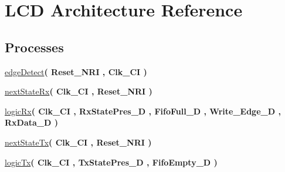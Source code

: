 \hypertarget{classLcdDriver_1_1LCD}{}\section{L\+CD Architecture Reference}
\label{classLcdDriver_1_1LCD}
\subsection*{Processes}
 \begin{DoxyCompactItemize}
\item 
\mbox{\label{classLcdDriver_1_1LCD_a8ddfdcf7d5753d2b8a763c46b1f66ede}} 
\hyperlink{classLcdDriver_1_1LCD_a8ddfdcf7d5753d2b8a763c46b1f66ede}{edge\+Detect}{\bfseries  ( {\bfseries \textcolor{vhdlchar}{Reset\+\_\+\+N\+RI}\textcolor{vhdlchar}{ }} , {\bfseries \textcolor{vhdlchar}{Clk\+\_\+\+CI}\textcolor{vhdlchar}{ }} )}
\item 
\mbox{\label{classLcdDriver_1_1LCD_a220a6885d47f04cad3e5b2a6f1528fd7}} 
\hyperlink{classLcdDriver_1_1LCD_a220a6885d47f04cad3e5b2a6f1528fd7}{next\+State\+Rx}{\bfseries  ( {\bfseries \textcolor{vhdlchar}{Clk\+\_\+\+CI}\textcolor{vhdlchar}{ }} , {\bfseries \textcolor{vhdlchar}{Reset\+\_\+\+N\+RI}\textcolor{vhdlchar}{ }} )}
\item 
\mbox{\label{classLcdDriver_1_1LCD_af3c0d0502a4e6217e00a6144a519144b}} 
\hyperlink{classLcdDriver_1_1LCD_af3c0d0502a4e6217e00a6144a519144b}{logic\+Rx}{\bfseries  ( {\bfseries \textcolor{vhdlchar}{Clk\+\_\+\+CI}\textcolor{vhdlchar}{ }} , {\bfseries \textcolor{vhdlchar}{Rx\+State\+Pres\+\_\+D}\textcolor{vhdlchar}{ }} , {\bfseries \textcolor{vhdlchar}{Fifo\+Full\+\_\+D}\textcolor{vhdlchar}{ }} , {\bfseries \textcolor{vhdlchar}{Write\+\_\+\+Edge\+\_\+D}\textcolor{vhdlchar}{ }} , {\bfseries \textcolor{vhdlchar}{Rx\+Data\+\_\+D}\textcolor{vhdlchar}{ }} )}
\item 
\mbox{\label{classLcdDriver_1_1LCD_a53afafce4de3dcf2709153c18013d0c6}} 
\hyperlink{classLcdDriver_1_1LCD_a53afafce4de3dcf2709153c18013d0c6}{next\+State\+Tx}{\bfseries  ( {\bfseries \textcolor{vhdlchar}{Clk\+\_\+\+CI}\textcolor{vhdlchar}{ }} , {\bfseries \textcolor{vhdlchar}{Reset\+\_\+\+N\+RI}\textcolor{vhdlchar}{ }} )}
\item 
\mbox{\label{classLcdDriver_1_1LCD_acd55b2e2a62219eec4bba8d508e1ffe3}} 
\hyperlink{classLcdDriver_1_1LCD_acd55b2e2a62219eec4bba8d508e1ffe3}{logic\+Tx}{\bfseries  ( {\bfseries \textcolor{vhdlchar}{Clk\+\_\+\+CI}\textcolor{vhdlchar}{ }} , {\bfseries \textcolor{vhdlchar}{Tx\+State\+Pres\+\_\+D}\textcolor{vhdlchar}{ }} , {\bfseries \textcolor{vhdlchar}{Fifo\+Empty\+\_\+D}\textcolor{vhdlchar}{ }} )}
\end{DoxyCompactItemize}
